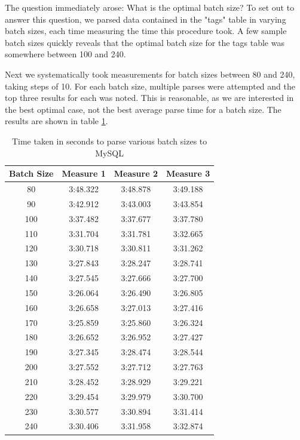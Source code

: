 \documentclass{article}
\begin{document}
The question immediately arose:  What is the optimal batch size? To set out
to answer this question, we parsed data contained in the "tags" table in
varying batch sizes, each time measuring the time this procedure took.  A
few sample batch sizes quickly reveals that the optimal batch size for the
tags table was somewhere between 100 and 240.

Next we systematically took measurements for batch sizes between 80 and
240, taking steps of 10.  For each batch size, multiple parses were
attempted and the top three results for each was noted. This is reasonable,
as we are interested in the best optimal case, not the best average parse
time for a batch size.  The results are shown in table \ref{table:1}.

\begin{table}[h!]
	\centering
	\begin{tabular}{||c c c c||}
		\hline
		Batch Size & Measure 1 & Measure 2 & Measure 3 \\ [0.5ex]
		\hline\hline
		80 & 3:48.322 & 3:48.878 & 3:49.188 \\ [0.5ex]
		\hline
		90 & 3:42.912 & 3:43.003 & 3:43.854 \\ [0.5ex]
		\hline
		100 & 3:37.482 & 3:37.677 & 3:37.780 \\ [0.5ex]
		\hline
		110 & 3:31.704 & 3:31.781 & 3:32.665 \\ [0.5ex]
		\hline
		120 & 3:30.718 & 3:30.811 & 3:31.262 \\ [0.5ex]
		\hline
		130 & 3:27.843 & 3:28.247 & 3:28.741 \\ [0.5ex]
		\hline
		140 & 3:27.545 & 3:27.666 & 3:27.700 \\ [0.5ex]
		\hline
		150 & 3:26.064 & 3:26.490 & 3:26.805 \\ [0.5ex]
		\hline
		160 & 3:26.658 & 3:27.013 & 3:27.416 \\ [0.5ex]
		\hline
		170 & 3:25.859 & 3:25.860 & 3:26.324 \\ [0.5ex]
		\hline
		180 & 3:26.652 & 3:26.952 & 3:27.427 \\ [0.5ex]
		\hline
		190 & 3:27.345 & 3:28.474 & 3:28.544 \\ [0.5ex]
		\hline
		200 & 3:27.552 & 3:27.712 & 3:27.763 \\ [0.5ex]
		\hline
		210 & 3:28.452 & 3:28.929 & 3:29.221 \\ [0.5ex]
		\hline
		220 & 3:29.454 & 3:29.979 & 3:30.700 \\ [0.5ex]
		\hline
		230 & 3:30.577 & 3:30.894 & 3:31.414 \\ [0.5ex]
		\hline
		240 & 3:30.406 & 3:31.958 & 3:32.874 \\ [0.5ex]
		\hline
	\end{tabular}
	\caption{Time taken in seconds to parse various batch sizes to MySQL}
	\label{table:1}
\end{table}
\end{document}
